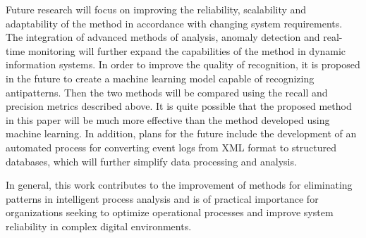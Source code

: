\documentclass[12pt, times]{article}
\begin{document}
	\hspace*{5mm} Future research will focus on improving the reliability, scalability and adaptability of the method in accordance with changing system requirements. The integration of advanced methods of analysis, anomaly detection and real-time monitoring will further expand the capabilities of the method in dynamic information systems. 
	In order to improve the quality of recognition, it is proposed in the future to create a machine learning model capable of recognizing antipatterns. Then the two methods will be compared using the recall and precision metrics described above. It is quite possible that the proposed method in this paper will be much more effective than the method developed using machine learning. In addition, plans for the future include the development of an automated process for converting event logs from XML format to structured databases, which will further simplify data processing and analysis.
	
	\hspace*{5mm} In general, this work contributes to the improvement of methods for eliminating patterns in intelligent process analysis and is of practical importance for organizations seeking to optimize operational processes and improve system reliability in complex digital environments.
	
	\clearpage
	\newpage
	
	\printbibliography
\end{document}
